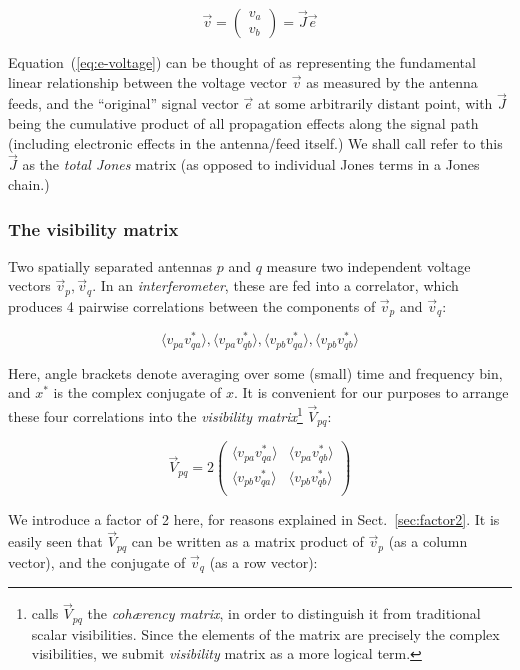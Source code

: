 \documentclass[]{aa}
\newcommand{\matrixtt}[4]{\left( \begin{array}{cc}#1&#2\\#3&#4\\\end{array} \right)}
\begin{document}
\begin{equation}\label{eq:e-voltage}
\vec v = \left( \begin{array}{c}v_a\\v_b\end{array} \right) = \vec J \vec e
\end{equation}
 
Equation~(\ref{eq:e-voltage}) can be thought of as representing the fundamental linear relationship between the voltage vector $\vec v$ as measured by the antenna feeds, and the ``original'' signal vector $\vec e$ at some arbitrarily distant point, with $\vec J$ being the cumulative product of all propagation effects along the signal path (including electronic effects in the antenna/feed itself.) We shall call refer to this $\vec J$ as the {\em total Jones} matrix (as opposed to individual Jones terms in a Jones chain.) 

\subsubsection{The visibility matrix}

Two spatially separated antennas $p$ and $q$ measure two independent voltage vectors $\vec v_p,\vec v_q$. In an {\em interferometer}, these are fed into a correlator, which produces 4 pairwise correlations between the components of $\vec v_p$ and $\vec v_q$:

    \begin{equation}\label{eq:correlation}
    \langle v_{pa}v^*_{qa}\rangle, \langle v_{pa}v^*_{qb}\rangle, 
    \langle v_{pb}v^*_{qa}\rangle, \langle v_{pb}v^*_{qb}\rangle
    \end{equation}

Here, angle brackets denote averaging over some (small) time and frequency bin, and $x^*$ is the complex conjugate of $x$.  It is convenient for our purposes to arrange these four correlations into the {\em visibility matrix\/}\footnote{\citet{ME4} calls $\vec V_{pq}$ the {\em coh{\ae}rency matrix}, in order to distinguish it from traditional scalar visibilities. Since the elements of the matrix are precisely the complex visibilities, we submit {\em visibility} matrix as a more logical term.} $\vec V_{pq}$:

    \[
    \vec V_{pq} = 2 \matrixtt{\langle v_{pa}v^*_{qa}\rangle}{\langle v_{pa}v^*_{qb}\rangle}{\langle v_{pb}v^*_{qa}\rangle}{\langle v_{pb}v^*_{qb}\rangle}
    \]

We introduce a factor of 2 here, for reasons explained in Sect.~\ref{sec:factor2}. It is easily seen that $\vec V_{pq}$ can be written as a matrix product of $\vec v_p$ (as a column vector), and the conjugate of $\vec v_q$ (as a row vector):
\end{document}

